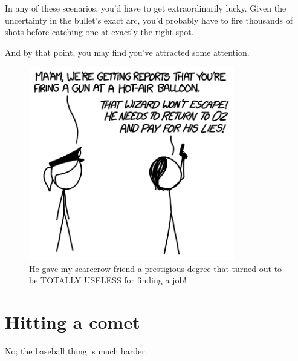 {{In any of these scenarios, you'd have to get extraordinarily lucky. Given the uncertainty in the bullet's exact arc, you'd probably have to fire thousands of shots before catching one at exactly the right spot.}

{And by that point, you may find you've attracted some attention.}

\begin{figure}[!htbp]
\centering
\includegraphics[scale=0.5, max width=0.8\textwidth]{imgs/a/81/catch_oz.png}
\caption{He gave my scarecrow friend a prestigious degree that turned out to be TOTALLY USELESS for finding a job!}
\end{figure}

{
\chapter{Hitting a comet}
}

\hfill{}

{No; the baseball thing is much harder.}

}
